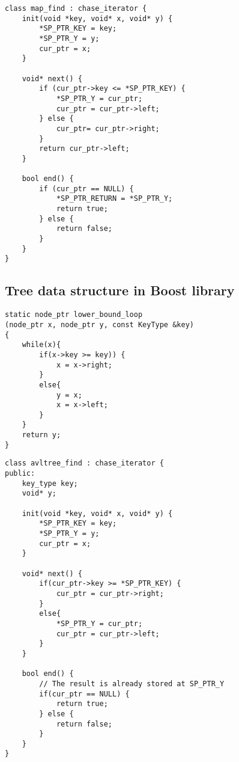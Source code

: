 \newpage
\begin{lstlisting}[caption={\pulse realization for \code{map::find()}},label={lst:map_mod}]
class map_find : chase_iterator {
    init(void *key, void* x, void* y) {
        *SP_PTR_KEY = key;
        *SP_PTR_Y = y;
        cur_ptr = x;
    }
  
    void* next() {
        if (cur_ptr->key <= *SP_PTR_KEY) {
            *SP_PTR_Y = cur_ptr;  
            cur_ptr = cur_ptr->left;
        } else {
            cur_ptr= cur_ptr->right;
        }
        return cur_ptr->left;
    }
  
    bool end() {
        if (cur_ptr == NULL) {
            *SP_PTR_RETURN = *SP_PTR_Y;  
            return true;
        } else {
            return false;
        }
    }
}
\end{lstlisting}
\newpage

\subsection{Tree data structure in Boost library}
\centering
\begin{lstlisting}[caption={Boost realization for \code{avltree::find()}},label={lst:avltree}]
static node_ptr lower_bound_loop
(node_ptr x, node_ptr y, const KeyType &key)
{
    while(x){
        if(x->key >= key)) {
            x = x->right;
        }
        else{
            y = x;
            x = x->left;
        }
    }
    return y;
}
\end{lstlisting}
\newpage

\begin{lstlisting}[caption={\pulse realization for \code{avltree::find()}},label={lst:avltree_mod}]
class avltree_find : chase_iterator {
public:
    key_type key;
    void* y;
  
    init(void *key, void* x, void* y) {
        *SP_PTR_KEY = key;
        *SP_PTR_Y = y;
        cur_ptr = x;
    }
  
    void* next() {
        if(cur_ptr->key >= *SP_PTR_KEY) {
            cur_ptr = cur_ptr->right;
        }
        else{
            *SP_PTR_Y = cur_ptr;
            cur_ptr = cur_ptr->left;
        }
    }
  
    bool end() {
        // The result is already stored at SP_PTR_Y
        if(cur_ptr == NULL) {
            return true;
        } else {
            return false;
        }
    }
}
\end{lstlisting}
